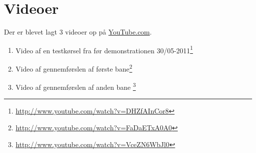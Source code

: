 \chapter{Videoer}\label{videoer}
Der er blevet lagt 3 videoer op på \url{YouTube.com}.
\begin{enumerate}
\item Video af en testkørsel fra før demonstrationen 30/05-2011\footnote{\url{http://www.youtube.com/watch?v=DHZfAInCor8}}
\item Video af gennemførslen af første bane\footnote{\url{http://www.youtube.com/watch?v=FaDaETxA0A0}}
\item Video af gennemførslen af anden bane \footnote{\url{http://www.youtube.com/watch?v=VceZN6WbJl0}}
\end{enumerate}
